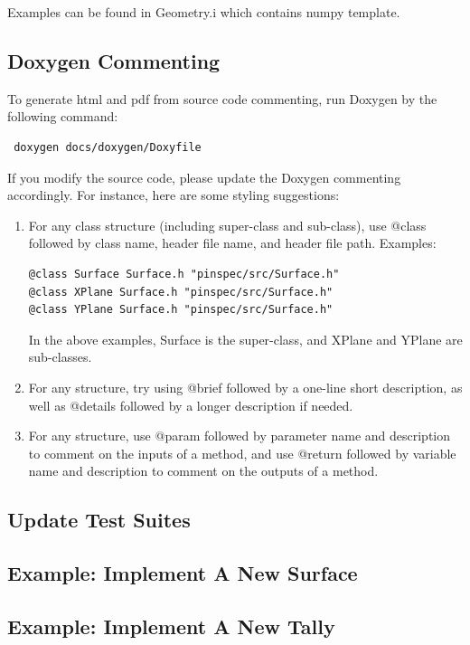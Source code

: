 \documentclass[titlepage]{article}
\begin{document}
Examples can be found in Geometry.i which contains numpy template. 



\clearpage
\subsection{Doxygen Commenting} \label{doxygen}
To generate html and pdf from source code commenting, run Doxygen by the following command:
\begin{verbatim}
 doxygen docs/doxygen/Doxyfile
\end{verbatim}

If you modify the source code, please update the Doxygen commenting accordingly. For instance, here are some styling suggestions:
\begin{enumerate}
\item For any class structure (including super-class and sub-class), use @class followed by class name, header file name, and header file path. Examples:
\begin{verbatim}
@class Surface Surface.h "pinspec/src/Surface.h"
@class XPlane Surface.h "pinspec/src/Surface.h"
@class YPlane Surface.h "pinspec/src/Surface.h"
\end{verbatim}
In the above examples, Surface is the super-class, and XPlane and YPlane are sub-classes. 

\item For any structure, try using @brief followed by a one-line short description, as well as @details followed by a longer description if needed. 

\item For any structure, use @param followed by parameter name and description to comment on the inputs of a method, and use @return followed by variable name and description to comment on the outputs of a method. 
\end{enumerate}


\clearpage
\subsection{Update Test Suites}

\clearpage
\subsection{Example: Implement A New Surface}

\clearpage
\subsection{Example: Implement A New Tally} \label{example-add-tally}
\end{document}
